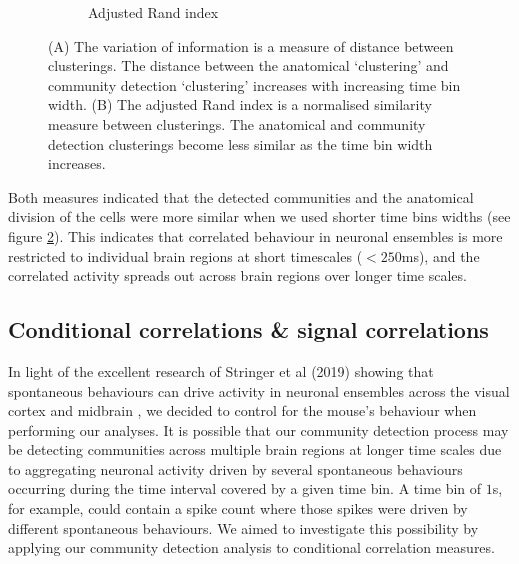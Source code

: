 \begin{figure}[h]
\begin{subfigure}[h]{0.5\linewidth}
      \caption{Adjusted Rand index}
      \label{fig:adjusted_rand_index_rectified_total}
    \end{subfigure}
    \caption{(A) The variation of information is a measure of distance between clusterings. The distance between the anatomical `clustering' and community detection `clustering' increases with increasing time bin width. (B) The adjusted Rand index is a normalised similarity measure between clusterings. The anatomical and community detection clusterings become less similar as the time bin width increases. }
    \label{fig:distance_measures}
  \end{figure}

  Both measures indicated that the detected communities and the anatomical division of the cells were more similar when we used shorter time bins widths (see figure \ref{fig:distance_measures}). This indicates that correlated behaviour in neuronal ensembles is more restricted to individual brain regions at short timescales ($<250$ms), and the correlated activity spreads out across brain regions over longer time scales.

  \subsection{Conditional correlations \& signal correlations}
  In light of the excellent research of Stringer et al (2019) showing that spontaneous behaviours can drive activity in neuronal ensembles across the visual cortex and midbrain \parencite{stringer}, we decided to control for the mouse's behaviour when performing our analyses. It is possible that our community detection process may be detecting communities across multiple brain regions at longer time scales due to aggregating neuronal activity driven by several spontaneous behaviours occurring during the time interval covered by a given time bin. A time bin of $1$s, for example, could contain a spike count where those spikes were driven by different spontaneous behaviours. We aimed to investigate this possibility by applying our community detection analysis to conditional correlation measures.


